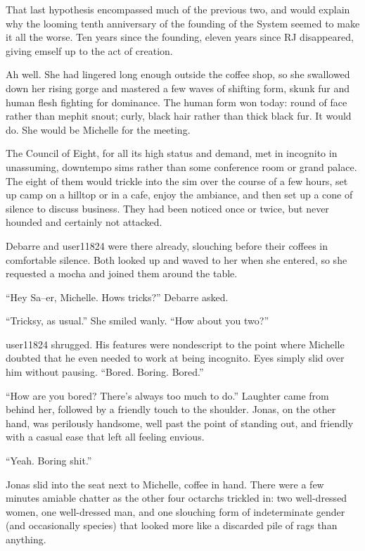 That last hypothesis encompassed much of the previous two, and would explain why the looming tenth anniversary of the founding of the System seemed to make it all the worse. Ten years since the founding, eleven years since RJ disappeared, giving emself up to the act of creation.

Ah well. She had lingered long enough outside the coffee shop, so she swallowed down her rising gorge and mastered a few waves of shifting form, skunk fur and human flesh fighting for dominance. The human form won today: round of face rather than mephit snout; curly, black hair rather than thick black fur. It would do. She would be Michelle for the meeting.

The Council of Eight, for all its high status and demand, met in incognito in unassuming, downtempo sims rather than some conference room or grand palace. The eight of them would trickle into the sim over the course of a few hours, set up camp on a hilltop or in a cafe, enjoy the ambiance, and then set up a cone of silence to discuss business. They had been noticed once or twice, but never hounded and certainly not attacked.

Debarre and user11824 were there already, slouching before their coffees in comfortable silence. Both looked up and waved to her when she entered, so she requested a mocha and joined them around the table.

``Hey Sa--er, Michelle. Hows tricks?'' Debarre asked.

``Tricksy, as usual.'' She smiled wanly. ``How about you two?''

user11824 shrugged. His features were nondescript to the point where Michelle doubted that he even needed to work at being incognito. Eyes simply slid over him without pausing. ``Bored. Boring. Bored.''

``How are you bored? There's always too much to do.'' Laughter came from behind her, followed by a friendly touch to the shoulder. Jonas, on the other hand, was perilously handsome, well past the point of standing out, and friendly with a casual ease that left all feeling envious.

``Yeah. Boring shit.''

Jonas slid into the seat next to Michelle, coffee in hand. There were a few minutes amiable chatter as the other four octarchs trickled in: two well-dressed women, one well-dressed man, and one slouching form of indeterminate gender (and occasionally species) that looked more like a discarded pile of rags than anything.

